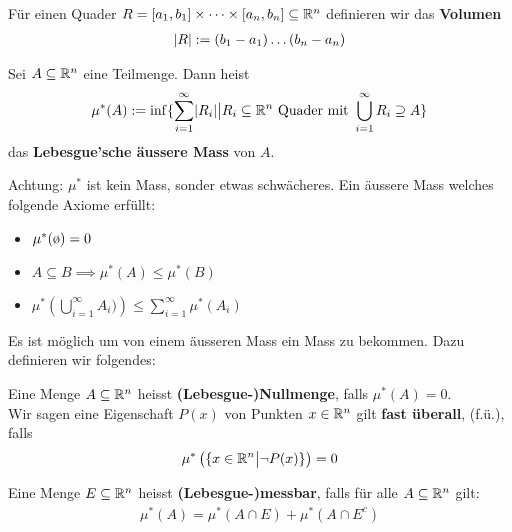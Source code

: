Für einen Quader $R = [a_1, b_1] \times \dots \times [a_n, b_n] \subseteq \mathbb{R}^n$ definieren wir das \textbf{Volumen}
\begin{align*}
	\vert R\vert := (b_1 - a_1) \dots (b_n - a_n)
\end{align*}


\begin{definition}[]
	Sei $A \subseteq \mathbb{R}^n$ eine Teilmenge. Dann heist
	\begin{align*}
					\mu^*(A) := \inf \{ \sum_{i = 1}^{\infty} \abs{R_i} \big\vert R_i \subseteq \R^n \text{ Quader mit } \bigcup_{i=1}^{\infty}R_i \supseteq A\}
	\end{align*}
	das \textbf{Lebesgue'sche äussere Mass} von $A$.
\end{definition}
Achtung: $\mu^*$ ist kein Mass, sonder etwas schwächeres. Ein äussere Mass welches folgende Axiome erfüllt:
\begin{itemize}
				\item $\mu^*(\es) = 0$
				\item $A \subseteq B \implies \mu^*(A) \leq \mu^*(B)$
				\item $\mu^* \left( \bigcup_{i=1}^{\infty} A_i) \right) \leq \sum_{i = 1}^{\infty} \mu^*(A_i)$
\end{itemize}

Es ist möglich um von einem äusseren Mass ein Mass zu bekommen. Dazu definieren wir folgendes:
\begin{definition}
				Eine Menge $A \subseteq \mathbb{R}^n$ heisst \textbf{(Lebesgue-)Nullmenge}, falls $\mu^*(A) = 0$.\\
				Wir sagen eine Eigenschaft $P(x)$ von Punkten $x \in \mathbb{R}^n$ gilt \textbf{fast überall}, (f.ü.), falls
				\begin{align*}
								\mu^* \left( \{ x \in \mathbb{R}^n \big\vert \lnot P(x) \} \right) = 0	
				\end{align*}
\end{definition}

\begin{definition}
Eine Menge $E \subseteq \mathbb{R}^n$ heisst \textbf{(Lebesgue-)messbar}, falls für alle $A \subseteq \mathbb{R}^n$ gilt:
\begin{align*}
				\mu^*(A) = \mu^*(A \cap E) + \mu^*(A \cap E^c)
\end{align*}
\end{definition}

